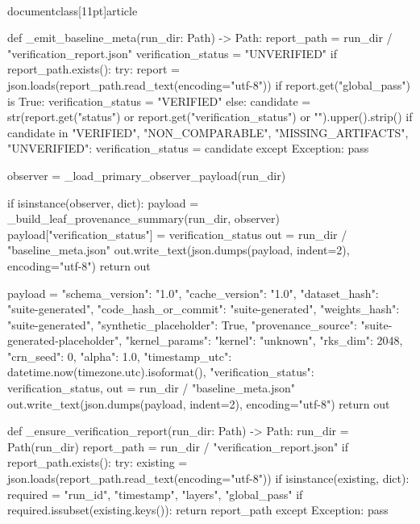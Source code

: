\\documentclass[11pt]{article}
\begin{document}
\begin{CodeBlock}
def _emit_baseline_meta(run_dir: Path) -> Path:
    report_path = run_dir / "verification_report.json"
    verification_status = "UNVERIFIED"
    if report_path.exists():
        try:
            report = json.loads(report_path.read_text(encoding="utf-8"))
            if report.get("global_pass") is True:
                verification_status = "VERIFIED"
            else:
                candidate = str(report.get("status") or report.get("verification_status") or "").upper().strip()
                if candidate in {"VERIFIED", "NON_COMPARABLE", "MISSING_ARTIFACTS", "UNVERIFIED"}:
                    verification_status = candidate
        except Exception:
            pass

    observer = _load_primary_observer_payload(run_dir)

    if isinstance(observer, dict):
        payload = _build_leaf_provenance_summary(run_dir, observer)
        payload["verification_status"] = verification_status
        out = run_dir / "baseline_meta.json"
        out.write_text(json.dumps(payload, indent=2), encoding="utf-8")
        return out

    payload = {
        "schema_version": "1.0",
        "cache_version": "1.0",
        "dataset_hash": "suite-generated",
        "code_hash_or_commit": "suite-generated",
        "weights_hash": "suite-generated",
        "synthetic_placeholder": True,
        "provenance_source": "suite-generated-placeholder",
        "kernel_params": {"kernel": "unknown"},
        "rks_dim": 2048,
        "crn_seed": 0,
        "alpha": 1.0,
        "timestamp_utc": datetime.now(timezone.utc).isoformat(),
        "verification_status": verification_status,
    }
    out = run_dir / "baseline_meta.json"
    out.write_text(json.dumps(payload, indent=2), encoding="utf-8")
    return out


def _ensure_verification_report(run_dir: Path) -> Path:
    run_dir = Path(run_dir)
    report_path = run_dir / "verification_report.json"
    if report_path.exists():
        try:
            existing = json.loads(report_path.read_text(encoding="utf-8"))
            if isinstance(existing, dict):
                required = {"run_id", "timestamp", "layers", "global_pass"}
                if required.issubset(existing.keys()):
                    return report_path
        except Exception:
            pass


\end{CodeBlock}
\end{document}
